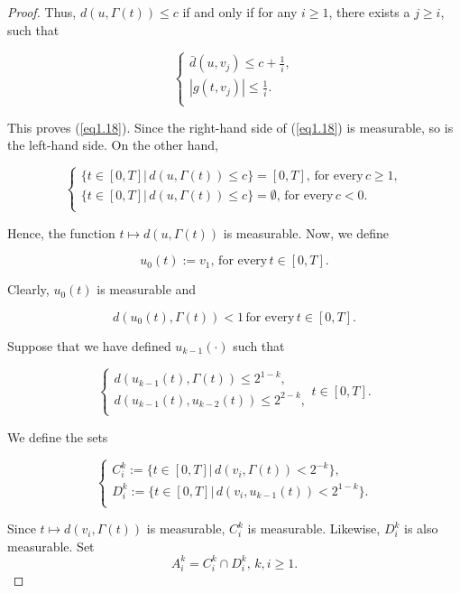 \begin{proof}
Thus, $d(u,\Gamma(t))\leq c$ if and only if for any $i\geq 1$, there exists a $j\geq i$, such that

$$\left\{ \begin{array}{l}
 \bar{d}(u,v_{j})\leq c+\frac{1}{i}, \\
 |g(t,v_{j})|\leq \frac{1}{i}. \\
\end{array}
\right.$$

This proves (\ref{eq1.18}). Since the right-hand side of (\ref{eq1.18}) is measurable, so is the left-hand side. On the other hand,

$$\left\{ \begin{array}{l}
\{t\in[0,T] |\, d(u,\Gamma(t))\leq c\}=[0,T],\,\mbox{for every}\, c\geq 1, \\
\{t\in[0,T] |\, d(u,\Gamma(t))\leq c\}=\emptyset,\,\mbox{for every}\, c<0. \\
\end{array}
\right.$$

Hence, the function $t\mapsto d(u,\Gamma(t))$ is measurable. Now, we define

$$u_0(t):=v_1,\,\mbox{for every}\, t\in [0,T].$$

Clearly, $u_0(t)$ is measurable and 

$$d(u_0(t),\Gamma(t))<1\,\mbox{for every}\,t\in[0,T].$$

Suppose that we have defined $u_{k-1}(\cdot)$ such that 

\begin{equation}\label{eq1.19}
\left\{ \begin{array}{l}
d(u_{k-1}(t),\Gamma(t))\leq 2^{1-k},  \\
d(u_{k-1}(t),u_{k-2}(t))\leq 2^{2-k},\\
\end{array}
\right. t\in[0,T].
\end{equation}

We define the sets

$$\left\{ \begin{array}{l}
	C^k_i:=\{t\in[0,T] |\, d(v_i,\Gamma(t))<2^{-k}\}, \\
	D^k_i:=\{t\in[0,T] |\, d(v_i,u_{k-1}(t))< 2^{1-k}\}.\\
\end{array}
\right.$$

Since $t\mapsto d(v_i,\Gamma(t))$ is measurable, $C^k_i$ is measurable. Likewise, $D^k_i$ is also measurable. Set
$$A^k_i=C^k_i\cap D^k_i, \,k,i\geq 1.$$


\end{proof}
